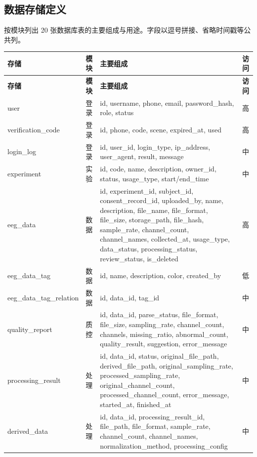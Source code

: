 \subsection{数据存储定义}

按模块列出 20 张数据库表的主要组成与用途。字段以逗号拼接、省略时间戳等公共列。

{\small
\begin{longtable}{|p{28mm}|p{18mm}|p{76mm}|p{16mm}|}
\hline
\textbf{存储} & \textbf{模块} & \textbf{主要组成} & \textbf{访问}\\\hline
\endfirsthead
\hline
\textbf{存储} & \textbf{模块} & \textbf{主要组成} & \textbf{访问}\\\hline
\endhead
user & 登录 & id, username, phone, email, password\_hash, role, status & 高 \\ \hline
verification\_code & 登录 & id, phone, code, scene, expired\_at, used & 高 \\ \hline
login\_log & 登录 & id, user\_id, login\_type, ip\_address, user\_agent, result, message & 中 \\ \hline
experiment & 实验 & id, code, name, description, owner\_id, status, usage\_type, start/end\_time & 中 \\ \hline
eeg\_data & 数据 & id, experiment\_id, subject\_id, consent\_record\_id, uploaded\_by, name, description, file\_name, file\_format, file\_size, storage\_path, file\_hash, sample\_rate, channel\_count, channel\_names, collected\_at, usage\_type, data\_status, processing\_status, review\_status, is\_deleted & 高 \\ \hline
eeg\_data\_tag & 数据 & id, name, description, color, created\_by & 低 \\ \hline
eeg\_data\_\allowbreak tag\_\allowbreak relation & 数据 & id, data\_id, tag\_id & 中 \\ \hline
quality\_report & 质控 & id, data\_id, parse\_status, file\_format, file\_size, sampling\_rate, channel\_count, channels, missing\_ratio, abnormal\_count, quality\_result, suggestion, error\_message & 中 \\ \hline
processing\_result & 处理 & id, data\_id, status, original\_file\_path, derived\_file\_path, original\_sampling\_rate, processed\_sampling\_rate, original\_channel\_count, processed\_channel\_count, error\_message, started\_at, finished\_at & 中 \\ \hline
derived\_data & 处理 & id, data\_id, processing\_result\_id, file\_path, file\_format, sample\_rate, channel\_count, channel\_names, normalization\_method, processing\_config & 中 \\ \hline

\end{longtable}}

